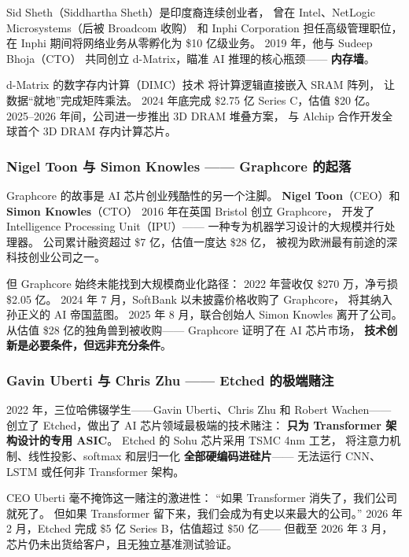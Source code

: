 Sid Sheth（Siddhartha Sheth）是印度裔连续创业者，
曾在 Intel、NetLogic Microsystems（后被 Broadcom 收购）
和 Inphi Corporation 担任高级管理职位，
在 Inphi 期间将网络业务从零孵化为 \$10 亿级业务。
2019 年，他与 Sudeep Bhoja（CTO）
共同创立 d-Matrix，瞄准 AI 推理的核心瓶颈——
\textbf{内存墙}。

d-Matrix 的数字存内计算（DIMC）技术
将计算逻辑直接嵌入 SRAM 阵列，
让数据``就地''完成矩阵乘法。
2024 年底完成 \$2.75 亿 Series C，估值 \$20 亿。
2025--2026 年间，公司进一步推出 3D DRAM 堆叠方案，
与 Alchip 合作开发全球首个 3D DRAM 存内计算芯片。

\subsubsection{Nigel Toon 与 Simon Knowles —— Graphcore 的起落}

Graphcore 的故事是 AI 芯片创业残酷性的另一个注脚。
\textbf{Nigel Toon}（CEO）和 \textbf{Simon Knowles}（CTO）
2016 年在英国 Bristol 创立 Graphcore，
开发了 Intelligence Processing Unit（IPU）——
一种专为机器学习设计的大规模并行处理器。
公司累计融资超过 \$7 亿，估值一度达 \$28 亿，
被视为欧洲最有前途的深科技创业公司之一。

但 Graphcore 始终未能找到大规模商业化路径：
2022 年营收仅 \$270 万，净亏损 \$2.05 亿。
2024 年 7 月，SoftBank 以未披露价格收购了 Graphcore，
将其纳入孙正义的 AI 帝国蓝图。
2025 年 8 月，联合创始人 Simon Knowles 离开了公司。
从估值 \$28 亿的独角兽到被收购——
Graphcore 证明了在 AI 芯片市场，
\textbf{技术创新是必要条件，但远非充分条件}。

\subsubsection{Gavin Uberti 与 Chris Zhu —— Etched 的极端赌注}

2022 年，三位哈佛辍学生——Gavin Uberti、Chris Zhu 和 Robert Wachen——
创立了 Etched，做出了 AI 芯片领域最极端的技术赌注：
\textbf{只为 Transformer 架构设计的专用 ASIC}。
Etched 的 Sohu 芯片采用 TSMC 4nm 工艺，
将注意力机制、线性投影、softmax 和层归一化
\textbf{全部硬编码进硅片}——
无法运行 CNN、LSTM 或任何非 Transformer 架构。

CEO Uberti 毫不掩饰这一赌注的激进性：
``如果 Transformer 消失了，我们公司就死了。
但如果 Transformer 留下来，我们会成为有史以来最大的公司。''
2026 年 2 月，Etched 完成 \$5 亿 Series B，估值超过 \$50 亿——
但截至 2026 年 3 月，
芯片仍未出货给客户，且无独立基准测试验证。

